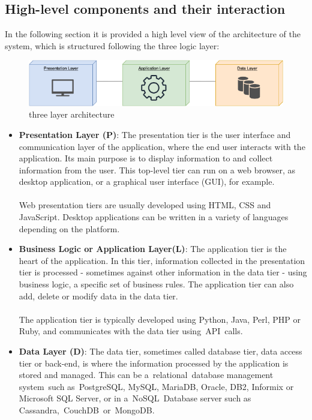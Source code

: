 \subsection{High-level components and their interaction}
In the following section it is provided a high level view of the architecture of the system, 
which is structured following the three logic layer:\\

\begin{figure}[H]
    \begin{center}
    \includegraphics[width=1.2\textwidth]{images/System architecture.png}
    \caption{three layer architecture}
    \label{fig:system architecture}
    \end{center}
\end{figure}

\begin{itemize}
    \item \textbf{Presentation Layer (P)}: The presentation tier is the user interface and communication layer 
    of the application, where the end user interacts with the application. Its main purpose is to display 
    information to and collect information from the user. This top-level tier can run on a web browser, 
    as desktop application, or a graphical user interface (GUI), for example. \\ \\Web presentation tiers 
    are usually developed using HTML, CSS and JavaScript. Desktop applications can be written in a variety 
    of languages depending on the platform.
    \item \textbf{Business Logic or Application Layer(L)}: The application tier is the heart of the application. 
    In this tier, information collected in the presentation tier is processed - sometimes against other information in the data tier - 
    using business logic, a specific set of business rules. The application tier can also add, delete or modify data in the data tier.\\ \\
    The application tier is typically developed using Python, Java, Perl, PHP or Ruby, and communicates with the data tier using API calls. 
    \item \textbf{Data Layer (D)}: The data tier, sometimes called database tier, data access tier or back-end, is where the information 
    processed by the application is stored and managed. This can be a relational database management system such as PostgreSQL, MySQL, MariaDB, 
    Oracle, DB2, Informix or Microsoft SQL Server, or in a NoSQL Database server such as Cassandra, CouchDB or MongoDB. 
\end{itemize}

